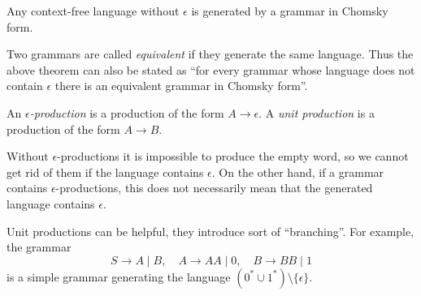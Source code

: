 \begin{page}
\setcounter{section}{5}
\setcounter{subsection}{2}
\setcounter{dfn}{6}
\label{portion:1226}

\begin{thm}
\label{thm:ChomskyForm}
Any context-free language without $\epsilon$ is generated by a grammar in Chomsky form.
\end{thm}

\end{page}

\begin{page}
\setcounter{section}{5}
\setcounter{subsection}{2}
\setcounter{dfn}{6}
\label{portion:1227}


Two grammars are called \emph{equivalent} if they generate the same language.
Thus the above theorem can also be stated as
``for every grammar whose language does not contain $\epsilon$ there is an equivalent grammar in Chomsky form''.


\end{page}

\begin{page}
\setcounter{section}{5}
\setcounter{subsection}{2}
\setcounter{dfn}{7}
\label{portion:1229}

\begin{dfn}
An \emph{$\epsilon$-production} is a production of the form $A \to \epsilon$.
A \emph{unit production} is a production of the form $A \to B$.
\end{dfn}

\end{page}

\begin{page}
\setcounter{section}{5}
\setcounter{subsection}{2}
\setcounter{dfn}{7}
\label{portion:1230}


Without $\epsilon$-productions it is impossible to produce the empty word,
so we cannot get rid of them if the language contains $\epsilon$.
On the other hand, if a grammar contains $\epsilon$-productions,
this does not necessarily mean that the generated language contains $\epsilon$.

Unit productions can be helpful, they introduce sort of ``branching''. For example, the grammar
\[
S \to A \mid B, \quad A \to AA \mid 0, \quad B \to BB \mid 1
\]
is a simple grammar generating the language $(0^* \cup 1^*) \setminus \{\epsilon\}$.



\end{page}


